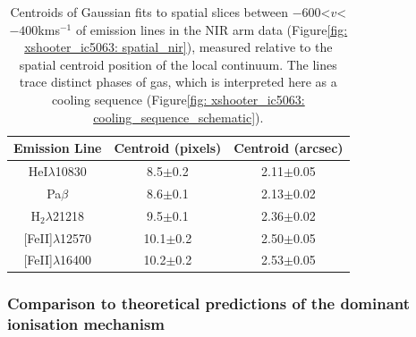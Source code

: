 \begin{table}[!t]
	\renewcommand{\arraystretch}{1.5}
    \centering
    \begin{tabular}{ccc}
    Emission Line           & Centroid (pixels) & Centroid (arcsec) \\ \hline
    HeI$\lambda$10830 & 8.5$\pm$0.2 & 2.11$\pm$0.05 \\
    Pa$\beta$ & 8.6$\pm$0.1 & 2.13$\pm$0.02 \\
    H$_\mathrm{2}\lambda$21218 & 9.5$\pm$0.1 & 2.36$\pm$0.02 \\
    {[FeII]$\lambda$12570} & 10.1$\pm$0.2 & 2.50$\pm$0.05 \\
    {[FeII]$\lambda$16400} & 10.2$\pm$0.2 & 2.53$\pm$0.05 \\                                                                                              
    \end{tabular}
    \caption[Measured centroids of Gaussian fits to the Spatial flux distributions of the {[}FeII{]}$\lambda$16400, {[}FeII{]}$\lambda$12570, H$_\mathrm{2}\lambda$21218, Pa$\mathrm{\beta}$, and HeI$\lambda$10830 emission lines for the outflows in IC.]{Centroids of Gaussian fits to spatial slices between \mbox{$-600$\;\textless\;$v$\;\textless\;$-400$\;km\;s$^{-1}$} of emission lines in the NIR arm data (Figure\;\ref{fig: xshooter_ic5063: spatial_nir}), measured relative to the spatial centroid position of the local continuum. The lines trace distinct phases of gas, which is interpreted here as a cooling sequence (Figure\;\ref{fig: xshooter_ic5063: cooling_sequence_schematic}).}
\label{tab: xshooter_ic5063: spatial_nir}
\end{table}

\subsubsection{Comparison to theoretical predictions of the dominant ionisation mechanism}
\label{section: xshooter_ic5063: discussion: mechanisms: model_comparison}

